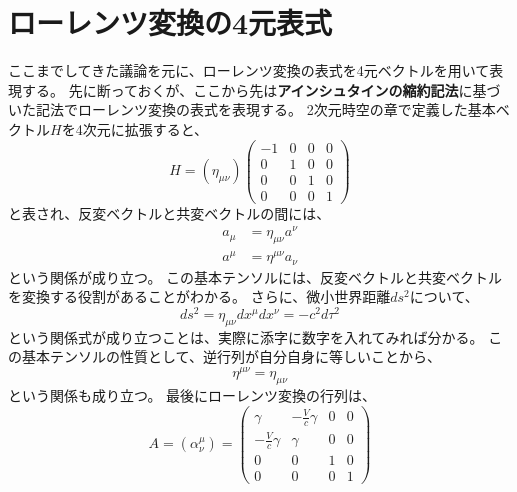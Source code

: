 \documentclass[a4paper]{jsreport}
\begin{document}
        \section{ローレンツ変換の4元表式}
            ここまでしてきた議論を元に、ローレンツ変換の表式を4元ベクトルを用いて表現する。
            先に断っておくが、ここから先は\textbf{アインシュタインの縮約記法}に基づいた記法でローレンツ変換の表式を表現する。
            2次元時空の章で定義した基本ベクトル$H$を4次元に拡張すると、
            \begin{equation}
                H = (\eta_{\mu\nu}) \begin{pmatrix}
                    -1 & 0 & 0 & 0 \\
                    0 & 1 & 0 & 0 \\
                    0 & 0 & 1 & 0 \\
                    0 & 0 & 0 & 1
                \end{pmatrix}
            \end{equation}
            と表され、反変ベクトルと共変ベクトルの間には、
            \begin{align}
                a_{\mu} &= \eta_{\mu\nu} a^{\nu} \\
                a^{\mu} &= \eta^{\mu\nu} a_{\nu}
            \end{align}
            という関係が成り立つ。
            この基本テンソルには、反変ベクトルと共変ベクトルを変換する役割があることがわかる。
            さらに、微小世界距離$ds^2$について、
            \begin{equation}
                ds^2 = \eta_{\mu\nu} dx^{\mu} dx^{\nu} = -c^2d\tau^2
            \end{equation}
            という関係式が成り立つことは、実際に添字に数字を入れてみれば分かる。
            この基本テンソルの性質として、逆行列が自分自身に等しいことから、
            \begin{equation}
                \eta^{\mu\nu} = \eta_{\mu\nu}
            \end{equation}
            という関係も成り立つ。
            最後にローレンツ変換の行列は、
            \begin{equation}
                A = (\alpha^\mu_\nu) = \begin{pmatrix}
                    \gamma & - \frac{V}{c} \gamma & 0 & 0 \\
                    - \frac{V}{c} \gamma & \gamma & 0 & 0 \\
                    0 & 0 & 1 & 0 \\
                    0 & 0 & 0 & 1
                \end{pmatrix}
            \end{equation}
\end{document}
